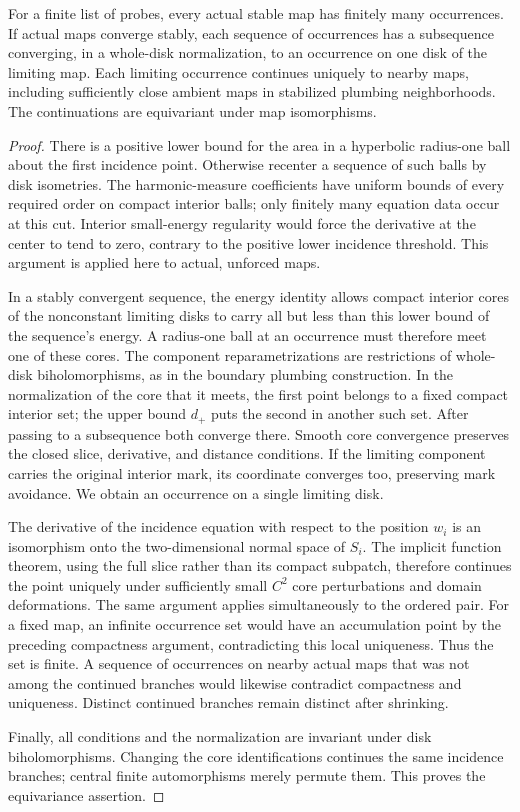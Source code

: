 \begin{lemma}\label{virt:probes}
For a finite list of probes, every actual stable map has finitely many
occurrences.  If actual maps converge stably, each sequence of occurrences
has a subsequence converging, in a whole-disk normalization, to an
occurrence on one disk of the limiting map.  Each limiting occurrence
continues uniquely to nearby maps, including sufficiently close ambient
maps in stabilized plumbing neighborhoods.  The continuations are
equivariant under map isomorphisms.
\end{lemma}

\begin{proof}
There is a positive lower bound for the area in a hyperbolic radius-one
ball about the first incidence point.  Otherwise recenter a sequence of
such balls by disk isometries.  The harmonic-measure coefficients have
uniform bounds of every required order on compact interior balls; only
finitely many equation data occur at this cut.  Interior small-energy
regularity would force the derivative at the center to tend to zero,
contrary to the positive lower incidence threshold.  This argument is
applied here to actual, unforced maps.

In a stably convergent sequence, the energy identity allows compact
interior cores of the nonconstant limiting disks to carry all but less
than this lower bound of the sequence's energy.  A radius-one ball at an
occurrence must therefore meet one of these cores.  The component
reparametrizations are restrictions of whole-disk biholomorphisms, as in
the boundary plumbing construction.  In the normalization of the core
that it meets, the first point belongs to a fixed compact interior set;
the upper bound $d_+$ puts the second in another such set.  After passing
to a subsequence both converge there.  Smooth core convergence preserves
the closed slice, derivative, and distance conditions.  If the limiting
component carries the original interior mark, its coordinate converges
too, preserving mark avoidance.  We obtain an occurrence on a single
limiting disk.

The derivative of the incidence equation with respect to the position
$w_i$ is an isomorphism onto the two-dimensional normal space of $S_i$.
The implicit function theorem, using the full slice rather than its
compact subpatch, therefore continues the point uniquely under
sufficiently small $C^2$ core perturbations and domain deformations.
The same argument applies simultaneously to the ordered pair.  For a
fixed map, an infinite occurrence set would have an accumulation point
by the preceding compactness argument, contradicting this local
uniqueness.  Thus the set is finite.  A sequence of occurrences on nearby
actual maps that was not among the continued branches would likewise
contradict compactness and uniqueness.  Distinct continued branches
remain distinct after shrinking.

Finally, all conditions and the normalization are invariant under disk
biholomorphisms.  Changing the core identifications continues the same
incidence branches; central finite automorphisms merely permute them.
This proves the equivariance assertion.
\end{proof}

